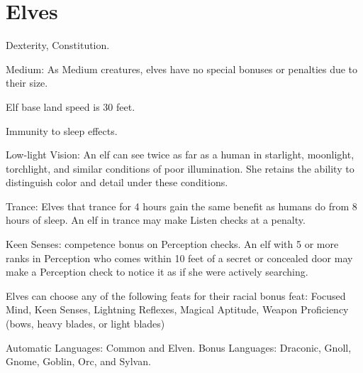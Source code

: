 \section{Elves}
\begin{itemize*}
\item {} Dexterity,  Constitution.
\item Medium: As Medium creatures, elves have no special bonuses or penalties due to their size.
\item Elf base land speed is 30 feet.
\item Immunity to sleep effects.
\item Low-light Vision: An elf can see twice as far as a human in starlight, moonlight, torchlight, and similar conditions of poor illumination. She retains the ability to distinguish color and detail under these conditions.
 \item Trance: Elves that trance for 4 hours gain the same benefit as humans do from 8 hours of sleep. An elf in trance may make Listen checks at a  penalty.
\item Keen Senses:  competence bonus on Perception checks. An elf with 5 or more ranks in Perception who comes within 10 feet of a secret or concealed door may make a Perception check to notice it as if she were actively searching. 
\item Elves can choose any of the following feats for their racial bonus feat: Focused Mind, Keen Senses, Lightning Reflexes, Magical Aptitude, Weapon Proficiency (bows, heavy blades, or light blades)
\item Automatic Languages: Common and Elven. Bonus Languages: Draconic, Gnoll, Gnome, Goblin, Orc, and Sylvan.
\end{itemize*}


